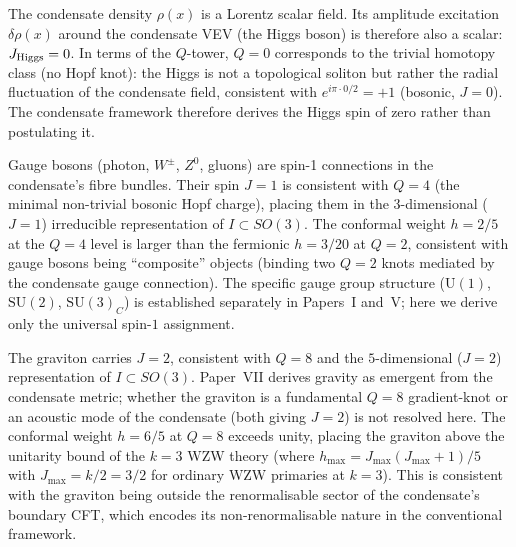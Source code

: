 \begin{remark}[The Higgs boson as the $Q=0$ condensate modulus]
\label{P13:rem:higgs_q0}
The condensate density $\rho(x)$ is a Lorentz scalar field.
Its amplitude excitation $\delta\rho(x)$ around the condensate VEV
(the Higgs boson) is therefore also a scalar: $J_{\rm Higgs}=0$.
In terms of the $Q$-tower, $Q=0$ corresponds to the trivial homotopy
class (no Hopf knot): the Higgs is not a topological soliton but rather
the radial fluctuation of the condensate field, consistent with
$e^{i\pi\cdot0/2} = +1$ (bosonic, $J=0$).
The condensate framework therefore derives the Higgs spin of zero rather
than postulating it.
\end{remark}

\begin{remark}[Gauge bosons as $Q=4$, $J=1$]
\label{P13:rem:gauge_q4}
Gauge bosons (photon, $W^\pm$, $Z^0$, gluons) are spin-1 connections
in the condensate's fibre bundles.
Their spin $J=1$ is consistent with $Q=4$ (the minimal non-trivial bosonic
Hopf charge), placing them in the $3$-dimensional ($J=1$) irreducible
representation of $I\subset SO(3)$.
The conformal weight $h=2/5$ at the $Q=4$ level is larger than the
fermionic $h=3/20$ at $Q=2$, consistent with gauge bosons being
``composite'' objects (binding two $Q=2$ knots mediated by the
condensate gauge connection).
The specific gauge group structure ($\mathrm{U}(1)$, $\mathrm{SU}(2)$,
$\mathrm{SU}(3)_C$) is established separately in Papers~I and~V;
here we derive only the universal spin-$1$ assignment.
\end{remark}

\begin{remark}[Graviton at $Q=8$, $J=2$]
\label{P13:rem:graviton_q8}
The graviton carries $J=2$, consistent with $Q=8$ and the
$5$-dimensional ($J=2$) representation of $I\subset SO(3)$.
Paper~VII derives gravity as emergent from the condensate
metric; whether the graviton is a fundamental $Q=8$ gradient-knot or
an acoustic mode of the condensate (both giving $J=2$) is not
resolved here.
The conformal weight $h=6/5$ at $Q=8$ exceeds unity, placing
the graviton above the unitarity bound of the $k=3$ WZW theory
(where $h_{\max}=J_{\max}(J_{\max}+1)/5$ with $J_{\max}=k/2=3/2$ for
ordinary WZW primaries at $k=3$).
This is consistent with the graviton being outside the renormalisable
sector of the condensate's boundary CFT, which encodes its
non-renormalisable nature in the conventional framework.
\end{remark}

